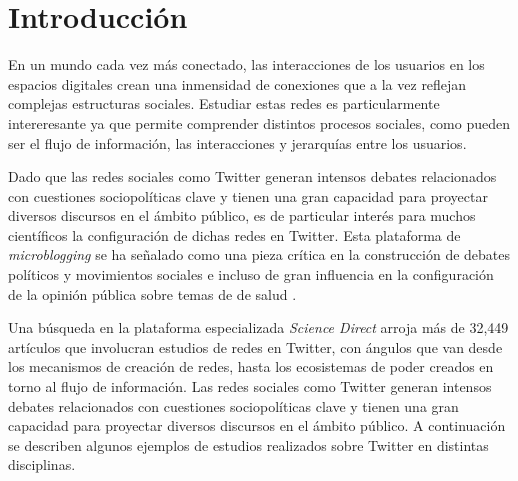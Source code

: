 \chapter{Introducción}
\label{chapter:1}

En un mundo cada vez más conectado, las interacciones de los usuarios en los espacios digitales crean una inmensidad de conexiones que a la vez reflejan complejas estructuras sociales. Estudiar estas redes es particularmente intereresante ya que permite comprender distintos procesos sociales, como pueden ser el flujo de información, las interacciones y jerarquías entre los usuarios.

Dado que las redes sociales como Twitter generan intensos debates relacionados con cuestiones sociopolíticas clave y tienen una gran capacidad para proyectar diversos discursos en el ámbito público, es de particular interés para muchos científicos la configuración de dichas redes en Twitter. Esta plataforma de \textit{microblogging} se ha señalado como una pieza crítica en la construcción de debates políticos y movimientos sociales \cite{barbera_understanding_2015} e incluso de gran influencia en la configuración de la opinión pública sobre temas de de salud \cite{sharevski_misinformation_2022}.

Una búsqueda en la plataforma especializada \textit{Science Direct} arroja más de 32,449 artículos que involucran estudios de redes en Twitter, con ángulos que van desde los mecanismos de creación de redes, hasta los ecosistemas de poder creados en torno al flujo de información. Las redes sociales como Twitter generan intensos debates relacionados con cuestiones sociopolíticas clave y tienen una gran capacidad para proyectar diversos discursos en el ámbito público. A continuación se describen algunos ejemplos de estudios realizados sobre Twitter en distintas disciplinas. 

